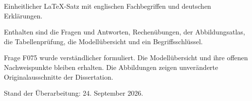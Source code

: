 \documentclass[11pt,a4paper]{article}
\begin{document}
\begin{titlepage}
\vspace{6mm}{\LARGE Fragenkatalog und Lernskript\par}
\vspace{12mm}{\large Vorbereitung für Florian Rzepka\par}
\vspace{16mm}
Einheitlicher LaTeX-Satz mit englischen Fachbegriffen und deutschen Erklärungen.

Enthalten sind die Fragen und Antworten, Rechenübungen, der Abbildungsatlas, die Tabellenprüfung, die Modellübersicht und ein Begriffsschlüssel.

Frage F075 wurde verständlicher formuliert. Die Modellübersicht und ihre offenen Nachweispunkte bleiben erhalten. Die Abbildungen zeigen unveränderte Originalausschnitte der Dissertation.

\vfill Stand der Überarbeitung: 24. September 2026.
\end{titlepage}
\tableofcontents
\end{document}
